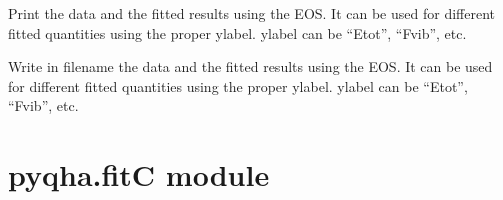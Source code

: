 \documentclass[letterpaper,10pt,english]{sphinxmanual}
\begin{document}

\begin{fulllineitems}
\label{pyqha:pyqha.eos.print_eos_data}
Print the data and the fitted results using the EOS. It can be used for
different fitted quantities using the proper ylabel. ylabel can be ``Etot'', 
``Fvib'', etc.

\end{fulllineitems}


\begin{fulllineitems}
\label{pyqha:pyqha.eos.write_Etotfitted}
Write in filename the data and the fitted results using the EOS. It can be used for
different fitted quantities using the proper ylabel. ylabel can be ``Etot'', 
``Fvib'', etc.

\end{fulllineitems}



\section{pyqha.fitC module}
\label{pyqha:pyqha-fitc-module}\label{pyqha:module-pyqha.fitC}
\end{document}

